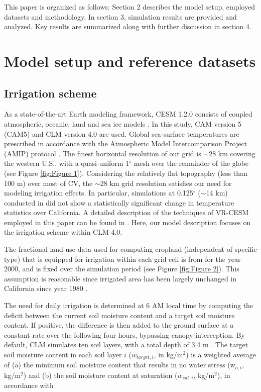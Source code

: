 \documentclass[draft,ms]{agutex}   %
\begin{document}
\begin{article}
This paper is organized as follows: Section 2 describes the model setup, employed datasets and methodology. In section 3, simulation results are provided and analyzed. Key results are summarized along with further discussion in section 4.

\section{Model setup and reference datasets}

\subsection{Irrigation scheme}

As a state-of-the-art Earth modeling framework, CESM 1.2.0 consists of coupled atmospheric, oceanic, land and sea ice models \citep{CAM5Tech, hurrell2013community}. In this study, CAM version 5 (CAM5) \citep{CAM5Tech} and CLM version 4.0 \citep{CLM40Tech} are used.  Global sea-surface temperatures are prescribed in accordance with the Atmospheric Model Intercomparison Project (AMIP) protocol \citep{Gates1992}.  The finest horizontal resolution of our grid is $\sim$28 km covering the western U.S., with a quasi-uniform 1$^\circ$ mesh over the remainder of the globe (see Figure \ref{fig:Figure 1}). Considering the relatively flat topography (less than 100 m) over most of CV, the $\sim$28 km grid resolution satisfies our need for modeling irrigation effects. In particular, simulations at 0.125$^\circ$ ($\sim$14 km) conducted in \cite{huang2016evaluation} did not show a statistically significant change in temperature statistics over California. A detailed description of the techniques of VR-CESM employed in this paper can be found in \cite{rhoades2015characterizing}. Here, our model description focuses on the irrigation scheme within CLM 4.0.

The fractional land-use data used for computing cropland (independent of specific type) that is equipped for irrigation within each grid cell is from \citet{siebert2005development} for the year 2000, and is fixed over the simulation period (see Figure \ref{fig:Figure 2}). This assumption is reasonable since irrigated area has been largely unchanged in California since year 1980 \citep{bonfils2007empirical}. 

The need for daily irrigation is determined at 6 AM local time by computing the deficit between the current soil moisture content and a target soil moisture content. If positive, the difference is then added to the ground surface at a constant rate over the following four hours, bypassing canopy interception. By default, CLM simulates ten soil layers, with a total depth of 3.4 m \citep{CLM40Tech}. The target soil moisture content in each soil layer $i$ ($w_{target, i}$, in kg/m$^2$) is a weighted average of (a) the minimum soil moisture content that results in no water stress (w$_{o,i}$, kg/m$^2$) and (b) the soil moisture content at saturation ($w_{sat,i}$, kg/m$^2$), in accordance with


\end{article}
\end{document}
